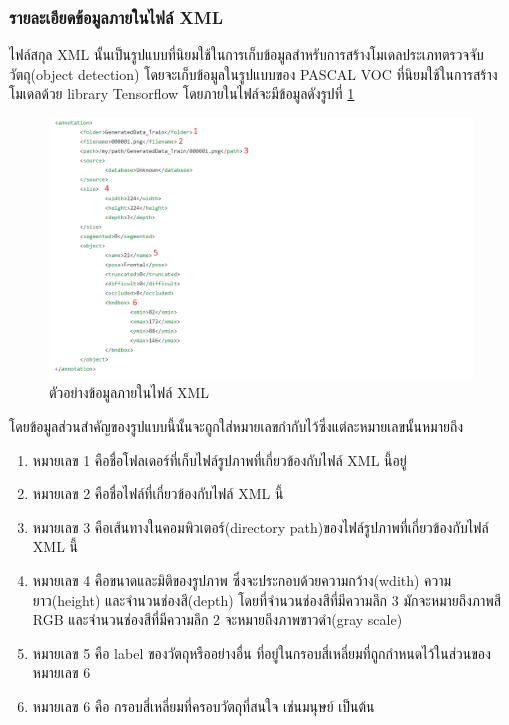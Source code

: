 \subsubsection{รายละเอียดข้อมูลภายในไฟล์ XML}
\label{XMLInfo}
ไฟล์สกุล XML นั้นเป็นรูปแบบที่นิยมใช้ในการเก็บข้อมูลสำหรับการสร้างโมเดลประเภทตรวจจับวัตถุ(object detection)
โดยจะเก็บข้อมูลในรูปแบบของ PASCAL VOC ที่นิยมใช้ในการสร้างโมเดลด้วย library Tensorflow โดยภายในไฟล์จะมีข้อมูลดังรูปที่ \ref{fig:XMLFormat}
\begin{figure}[!ht]
    \centering
    \includegraphics[width=1\textwidth]{chapter3/images/3_6/XMLFormat.png}
    \caption{ตัวอย่างข้อมูลภายในไฟล์ XML}
    \label{fig:XMLFormat}
\end{figure}
โดยข้อมูลส่วนสำคัญของรูปแบบนี้นั้นจะถูกใส่หมายเลขกำกับไว้ซึ่งแต่ละหมายเลขนั้นหมายถึง
\begin{enumerate}
	\setlength\itemsep{-0.25em}
    \item หมายเลข 1 คือชื่อโฟลเดอร์ที่เก็บไฟล์รูปภาพที่เกี่ยวข้องกับไฟล์ XML นี้อยู่
    \item หมายเลข 2 คือชื่อไฟล์ที่เกี่ยวข้องกับไฟล์ XML นี้
    \item หมายเลข 3 คือเส้นทางในคอมพิวเตอร์(directory path)ของไฟล์รูปภาพที่เกี่ยวข้องกับไฟล์ XML นี้
    \item หมายเลข 4 คือขนาดและมิติของรูปภาพ ซึ่งจะประกอบด้วยความกว้าง(wdith) ความยาว(height) และจำนวนช่องสี(depth) 
    โดยที่จำนวนช่องสีที่มีความลึก 3 มักจะหมายถึงภาพสี RGB และจำนวนช่องสีที่มีความลึก 2 จะหมายถึงภาพขาวดำ(gray scale)
	\item หมายเลข 5 คือ label ของวัตถุหรืออย่างอื่น ที่อยู่ในกรอบสี่เหลี่ยมที่ถูกกำหนดไว้ในส่วนของหมายเลข 6
	\item หมายเลข 6 คือ กรอบสี่เหลี่ยมที่ครอบวัตถุที่สนใจ เช่นมนุษย์ เป็นต้น
\end{enumerate}